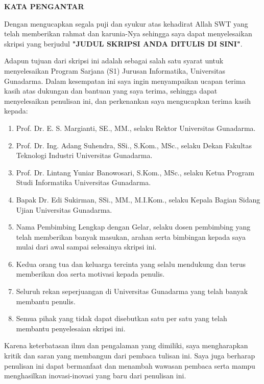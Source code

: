 \clearpage
{}

\begin{center}
	\textbf{\fontsize{14}{17}\selectfont KATA PENGANTAR}
\end{center}

\vspace{1cm}

Dengan mengucapkan segala puji dan syukur atas kehadirat Allah SWT yang telah memberikan rahmat dan karunia-Nya sehingga saya dapat menyelesaikan skripsi yang berjudul \textbf{"JUDUL SKRIPSI ANDA DITULIS DI SINI"}. 

Adapun tujuan dari skripsi ini adalah sebagai salah satu syarat untuk menyelesaikan Program Sarjana (S1) Jurusan Informatika, Universitas Gunadarma. Dalam kesempatan ini saya ingin menyampaikan ucapan terima kasih atas dukungan dan bantuan yang saya terima, sehingga dapat menyelesaikan penulisan ini, dan perkenankan saya mengucapkan terima kasih kepada:

\begin{enumerate}
	\item Prof. Dr. E. S. Margianti, SE., MM., selaku Rektor Universitas Gunadarma.
	\item Prof. Dr. Ing. Adang Suhendra, SSi., S.Kom., MSc., selaku Dekan Fakultas Teknologi Industri Universitas Gunadarma.
	\item Prof. Dr. Lintang Yuniar Banowosari, S.Kom., MSc., selaku Ketua Program Studi Informatika Universitas Gunadarma.
	\item Bapak Dr. Edi Sukirman, SSi., MM., M.I.Kom., selaku Kepala Bagian Sidang Ujian Universitas Gunadarma.
	\item Nama Pembimbing Lengkap dengan Gelar, selaku dosen pembimbing yang telah memberikan banyak masukan, arahan serta bimbingan kepada saya mulai dari awal sampai selesainya skripsi ini.
	\item Kedua orang tua dan keluarga tercinta yang selalu mendukung dan terus memberikan doa serta motivasi kepada penulis.
	\item Seluruh rekan seperjuangan di Universitas Gunadarma yang telah banyak membantu penulis.
	\item Semua pihak yang tidak dapat disebutkan satu per satu yang telah membantu penyelesaian skripsi ini.
\end{enumerate}

Karena keterbatasan ilmu dan pengalaman yang dimiliki, saya mengharapkan kritik dan saran yang membangun dari pembaca tulisan ini. Saya juga berharap penulisan ini dapat bermanfaat dan menambah wawasan pembaca serta mampu menghasilkan inovasi-inovasi yang baru dari penulisan ini.

